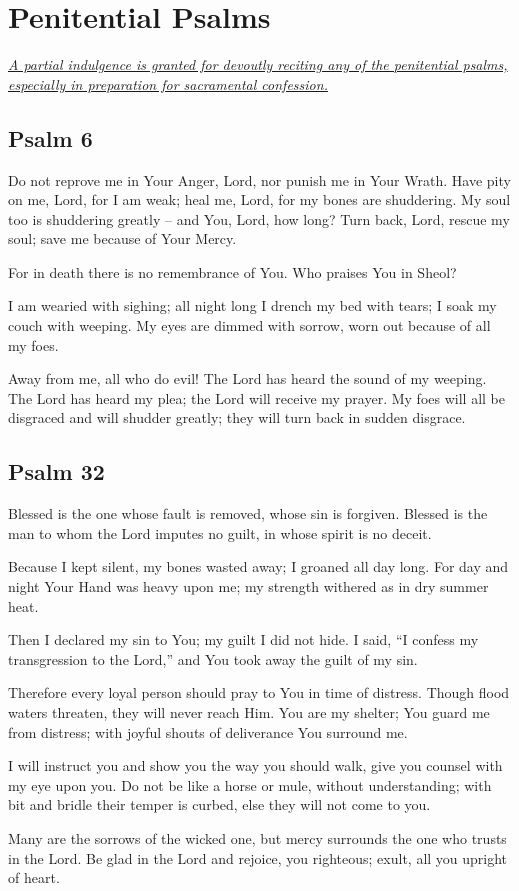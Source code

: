 \documentclass[12pt]{article}
\newcommand{\prayersection}[1]{\section{#1}}
\newcommand{\prayertitle}[1]{\subsection{#1}}
\newcommand{\indulgencedprayertitle}[1]{\prayertitle{#1 \protect\kreuz}}
\newcommand{\emphasis}[1]{\emph{#1}}
\newcommand{\emphasis}[1]{\textsl{#1}}
\newcommand{\note}[1]{{\small{\emphasis{#1}}}\newline}
\newcommand{\linkednote}[2]{\hyperlink{#1}{\note{#2}}}
\begin{document}
\newpage

\prayersection{Penitential Psalms}
\linkednote{grant9}{A partial indulgence is granted for devoutly reciting any of the penitential psalms, especially in preparation for sacramental confession.}
\indulgencedprayertitle{Psalm 6}
Do not reprove me in Your Anger, Lord,
nor punish me in Your Wrath.
Have pity on me, Lord, for I am weak;
heal me, Lord, for my bones are shuddering.
My soul too is shuddering greatly -- and You, Lord, how long?
Turn back, Lord, rescue my soul;
save me because of Your Mercy.

For in death there is no remembrance of You.
Who praises You in Sheol?

I am wearied with sighing;
all night long I drench my bed with tears;
I soak my couch with weeping.
My eyes are dimmed with sorrow, worn out because of all my foes.

Away from me, all who do evil!
The Lord has heard the sound of my weeping.
The Lord has heard my plea;
the Lord will receive my prayer.
My foes will all be disgraced and will shudder greatly;
they will turn back in sudden disgrace.

\indulgencedprayertitle{Psalm 32}
Blessed is the one whose fault is removed, whose sin is forgiven.
Blessed is the man to whom the Lord imputes no guilt, in whose spirit is no deceit.

Because I kept silent, my bones wasted away;
I groaned all day long.
For day and night Your Hand was heavy upon me;
my strength withered as in dry summer heat.

Then I declared my sin to You;
my guilt I did not hide.
I said, ``I confess my transgression to the Lord,'' and You took away the guilt of my sin.

Therefore every loyal person should pray to You in time of distress.
Though flood waters threaten, they will never reach Him.
You are my shelter; You guard me from distress;
with joyful shouts of deliverance You surround me.

I will instruct you and show you the way you should walk, give you counsel with my eye upon you.
Do not be like a horse or mule, without understanding;
with bit and bridle their temper is curbed, else they will not come to you.

Many are the sorrows of the wicked one, but mercy surrounds the one who trusts in the Lord.
Be glad in the Lord and rejoice, you righteous;
exult, all you upright of heart.
\end{document}
